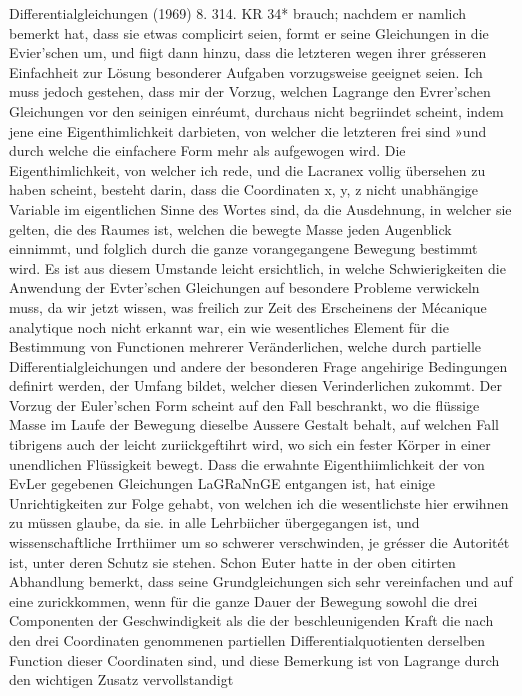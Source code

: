 \documentclass[11pt]{article}
\begin{document}
Differentialgleichungen (1969) 8. 314. KR 34*
brauch; nachdem er namlich bemerkt hat, dass sie etwas complicirt seien, formt er
seine Gleichungen in die Evier’schen um, und fiigt dann hinzu, dass die letzteren wegen ihrer grésseren Einfachheit zur Lösung besonderer Aufgaben vorzugsweise geeignet
seien. Ich muss jedoch gestehen, dass mir der Vorzug, welchen Lagrange den Evrer’schen
Gleichungen vor den seinigen einréumt, durchaus nicht begriindet scheint, indem jene eine
Eigenthimlichkeit darbieten, von welcher die letzteren frei sind »und durch welche die einfachere Form mehr als aufgewogen wird. Die Eigenthimlichkeit, von welcher ich rede, und
die Lacranex vollig übersehen zu haben scheint, besteht darin, dass die Coordinaten x, y,
z nicht unabhängige Variable im eigentlichen Sinne des Wortes sind, da die Ausdehnung,
in welcher sie gelten, die des Raumes ist, welchen die bewegte Masse jeden Augenblick
einnimmt, und folglich durch die ganze vorangegangene Bewegung bestimmt wird. Es ist
aus diesem Umstande leicht ersichtlich, in welche Schwierigkeiten die Anwendung der Evter’schen Gleichungen auf besondere Probleme verwickeln muss, da wir jetzt wissen, was
freilich zur Zeit des Erscheinens der Mécanique analytique noch nicht erkannt war, ein
wie wesentliches Element für die Bestimmung von Functionen mehrerer Veränderlichen,
welche durch partielle Differentialgleichungen und andere der besonderen Frage angehirige
Bedingungen definirt werden, der Umfang bildet, welcher diesen Verinderlichen zukommt.
Der Vorzug der Euler’schen Form scheint auf den Fall beschrankt, wo die flüssige Masse
im Laufe der Bewegung dieselbe Aussere Gestalt behalt, auf welchen Fall tibrigens auch
der leicht zuriickgeftihrt wird, wo sich ein fester Körper in einer unendlichen Flüssigkeit
bewegt. Dass die erwahnte Eigenthiimlichkeit der von EvLer gegebenen Gleichungen
LaGRaNnGE entgangen ist, hat einige Unrichtigkeiten zur Folge gehabt, von welchen ich
die wesentlichste hier erwihnen zu müssen glaube, da sie. in alle Lehrbiicher übergegangen
ist, und wissenschaftliche Irrthiimer um so schwerer verschwinden, je grésser die Autoritét
ist, unter deren Schutz sie stehen. Schon Euter hatte in der oben citirten Abhandlung bemerkt, dass seine Grundgleichungen sich sehr vereinfachen und auf eine zurickkommen,
wenn für die ganze Dauer der Bewegung sowohl die drei Componenten der Geschwindigkeit als die der beschleunigenden Kraft die nach den drei Coordinaten genommenen
partiellen Differentialquotienten derselben Function dieser Coordinaten sind, und diese
Bemerkung ist von Lagrange durch den wichtigen Zusatz vervollstandigt
\end{document}
